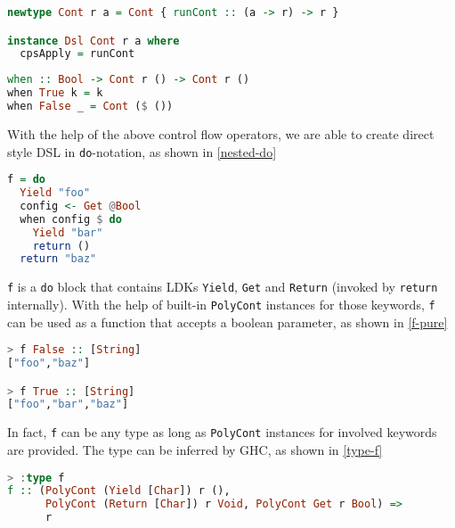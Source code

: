 \begin{lstlisting}[float=htbp,language={Haskell},caption={\lstinline{Dsl} instance for \lstinline{Cont}},label={Cont-instance}]
newtype Cont r a = Cont { runCont :: (a -> r) -> r }

instance Dsl Cont r a where
  cpsApply = runCont
\end{lstlisting}

\begin{lstlisting}[float=htbp,language={Haskell},caption={Control flow operator \lstinline{when}},label={when}]
when :: Bool -> Cont r () -> Cont r ()
when True k = k
when False _ = Cont ($ ())
\end{lstlisting}

With the help of the above control flow operators, we are able to create direct style DSL in \lstinline{do}-notation, as shown in \cref{nested-do}

\begin{lstlisting}[float=htbp,language={Haskell},caption={Nested \lstinline{Dsl} \lstinline{do} blocks},label={nested-do}]
f = do
  Yield "foo"
  config <- Get @Bool
  when config $ do
    Yield "bar"
    return ()
  return "baz"
\end{lstlisting}

\lstinline{f} is a \lstinline{do} block that contains LDKs \lstinline{Yield}, \lstinline{Get} and \lstinline{Return} (invoked by \lstinline{return} internally). With the help of built-in \lstinline{PolyCont} instances for those keywords, \lstinline{f} can be used as a function that accepts a boolean parameter, as shown in \cref{f-pure}

\begin{lstlisting}[float=htbp,language={Haskell},caption={Running \lstinline{f} purely in REPL},label={f-pure}]
> f False :: [String]
["foo","baz"]

> f True :: [String]
["foo","bar","baz"]
\end{lstlisting}

In fact, \lstinline{f} can be any type as long as \lstinline{PolyCont} instances for involved keywords are provided. The type can be inferred by GHC, as shown in \cref{type-f}

\begin{lstlisting}[float=htbp,language={Haskell},caption={The inferred type of a \lstinline{do} block},label={type-f}]
> :type f
f :: (PolyCont (Yield [Char]) r (),
      PolyCont (Return [Char]) r Void, PolyCont Get r Bool) =>
      r
\end{lstlisting}

